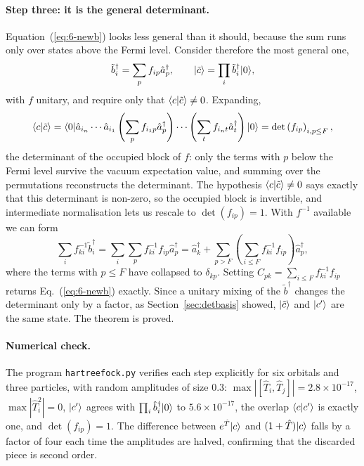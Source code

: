 \paragraph{Step three: it is the general determinant.}
Equation~(\ref{eq:6-newb}) looks less general than it should, because the sum
runs only over states above the Fermi level.  Consider therefore the most
general one,
\begin{equation}
  \tilde{b}^{\dagger}_{i} = \sum_{p}f_{ip}\hat{a}^{\dagger}_{p},
  \qquad
  \vert \tilde{c} \rangle = \prod_{i}\tilde{b}^{\dagger}_{i}\vert 0 \rangle,
  \label{eq:6-generalb}
\end{equation}
with $f$ unitary, and require only that
$\langle c \vert \tilde{c} \rangle\ne0$.  Expanding,
\begin{equation}
  \langle c \vert \tilde{c} \rangle
  = \langle 0 \vert\hat{a}_{i_n}\cdots\hat{a}_{i_1}
    \left(\sum_{p}f_{i_1p}\hat{a}^{\dagger}_{p}\right)\cdots
    \left(\sum_{t}f_{i_nt}\hat{a}^{\dagger}_{t}\right)\vert 0 \rangle
  = \det\left(f_{ip}\right)_{i,p\le F},
  \label{eq:6-overlapdet}
\end{equation}
the determinant of the occupied block of $f$: only the terms with $p$ below
the Fermi level survive the vacuum expectation value, and summing over the
permutations reconstructs the determinant.  The hypothesis
$\langle c \vert \tilde{c} \rangle\ne0$ says exactly that this determinant is non-zero, so
the occupied block is invertible, and intermediate normalisation lets us
rescale to $\det(f_{ip})=1$.  With $f^{-1}$ available we can form
\begin{equation}
  \sum_{i}f^{-1}_{ki}\tilde{b}^{\dagger}_{i}
  = \sum_{i}\sum_{p}f^{-1}_{ki}f_{ip}\hat{a}^{\dagger}_{p}
  = \hat{a}^{\dagger}_{k}
    + \sum_{p>F}\left(\sum_{i\le F}f^{-1}_{ki}f_{ip}\right)
      \hat{a}^{\dagger}_{p},
  \label{eq:6-finverse}
\end{equation}
where the terms with $p\le F$ have collapsed to $\delta_{kp}$.  Setting
$C_{pk}=\sum_{i\le F}f^{-1}_{ki}f_{ip}$ returns
Eq.~(\ref{eq:6-newb}) exactly.  Since a unitary mixing of the
$\tilde{b}^{\dagger}$ changes the determinant only by a factor, as
Section~\ref{sec:detbasis} showed, $\vert \tilde{c} \rangle$ and $\vert c' \rangle$ are the
same state.  The theorem is proved.

\paragraph{Numerical check.}
The program \texttt{hartreefock.py} verifies each step explicitly for six
orbitals and three particles, with random amplitudes of size $0.3$:
$\max|[\hat{T}_i,\hat{T}_j]| = 2.8\times10^{-17}$,
$\max|\hat{T}_i^2| = 0$,
$\vert c' \rangle$ agrees with $\prod_i\hat{b}^{\dagger}_i\vert 0 \rangle$ to
$5.6\times10^{-17}$, the overlap $\langle c \vert c' \rangle$ is exactly one, and
$\det(f_{ip})=1$.  The difference between $e^{\hat{T}}\vert c \rangle$ and
$(1+\hat{T})\vert c \rangle$ falls by a factor of four each time the amplitudes are
halved, confirming that the discarded piece is second order.

